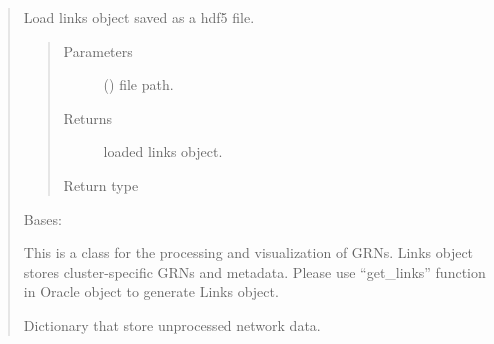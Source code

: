 \documentclass[letterpaper,10pt,english]{sphinxmanual}
\begin{document}
\begin{quote}

\begin{fulllineitems}
\label{\detokenize{modules/celloracle.network_analysis:celloracle.network_analysis.load_links}}
Load links object saved as a hdf5 file.
\begin{quote}\begin{description}
\item[{Parameters}] \leavevmode
{} () \textendash{} file path.

\item[{Returns}] \leavevmode
loaded links object.

\item[{Return type}] \leavevmode
{\hyperref[\detokenize{modules/celloracle:celloracle.Links}]{}}

\end{description}\end{quote}

\end{fulllineitems}


\begin{fulllineitems}
\label{\detokenize{modules/celloracle.network_analysis:celloracle.network_analysis.Links}}
Bases: 

This is a class for the processing and visualization of GRNs.
Links object stores cluster-specific GRNs and metadata.
Please use “get\_links” function in Oracle object to generate Links object.

\begin{fulllineitems}
\label{\detokenize{modules/celloracle.network_analysis:celloracle.network_analysis.Links.links_dict}}
 \textendash{} Dictionary that store unprocessed network data.


\end{fulllineitems}
\end{fulllineitems}
\end{quote}
\end{document}
